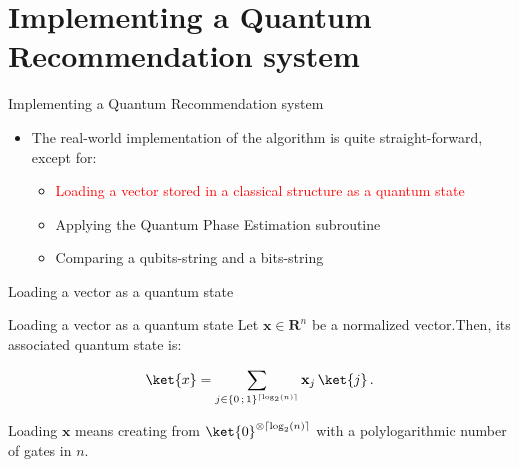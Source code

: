 \documentclass{beamer}
\begin{document}
\section{Implementing a Quantum Recommendation system}

\begin{frame}{Implementing a Quantum Recommendation system}
    \begin{itemize}
        \item The real-world implementation of the algorithm is quite straight-forward, except for:\pause
        \begin{itemize}
            \item \textcolor<5->{red}{Loading a vector stored in a classical structure as a quantum state}\pause
            \item Applying the Quantum Phase Estimation subroutine\pause
            \item Comparing a qubits-string and a bits-string
        \end{itemize}
    \end{itemize}
\end{frame}

\begin{frame}{Loading a vector as a quantum state}
    \begin{block}{Loading a vector as a quantum state}
        Let \(\mathbf{x}\in\mathbf{R}^n\) be a normalized vector.\pause Then, its associated quantum state is:
        
        \[\ket{x}=\sum_{j\in\{0\,;\,1\}^{\left\lceil\log_2(n)\right\rceil}}\mathbf{x}_j\,\ket{j}\,.\]\pause
        
        Loading $\mathbf{x}$ means creating  from $\ket{0}^{\otimes\left\lceil\log_2(n)\right\rceil}$ with a polylogarithmic number of gates in $n$\footnotemark.
    \end{block}
\end{frame}
\end{document}
